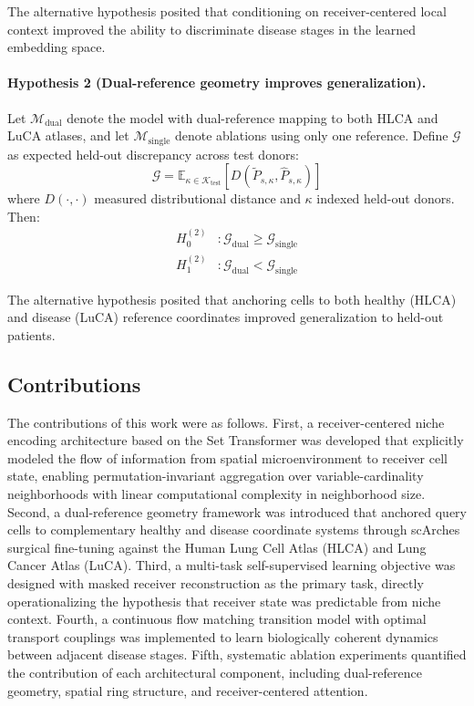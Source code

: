 The alternative hypothesis posited that conditioning on receiver-centered local context improved the ability to discriminate disease stages in the learned embedding space.

\paragraph{Hypothesis 2 (Dual-reference geometry improves generalization).} Let $\mathcal{M}_{\text{dual}}$ denote the model with dual-reference mapping to both HLCA and LuCA atlases, and let $\mathcal{M}_{\text{single}}$ denote ablations using only one reference. Define $\mathcal{G}$ as expected held-out discrepancy across test donors:
\begin{equation}
\mathcal{G} = \mathbb{E}_{\kappa \in \mathcal{K}_{\text{test}}} \left[ D(\tilde{P}_{s,\kappa}, \hat{P}_{s,\kappa}) \right]
\end{equation}
where $D(\cdot, \cdot)$ measured distributional distance and $\kappa$ indexed held-out donors. Then:
\begin{align}
H_0^{(2)}&: \mathcal{G}_{\text{dual}} \geq \mathcal{G}_{\text{single}} \\
H_1^{(2)}&: \mathcal{G}_{\text{dual}} < \mathcal{G}_{\text{single}}
\end{align}

The alternative hypothesis posited that anchoring cells to both healthy (HLCA) and disease (LuCA) reference coordinates improved generalization to held-out patients.


\subsection{Contributions}

The contributions of this work were as follows. First, a receiver-centered niche encoding architecture based on the Set Transformer was developed that explicitly modeled the flow of information from spatial microenvironment to receiver cell state, enabling permutation-invariant aggregation over variable-cardinality neighborhoods with linear computational complexity in neighborhood size. Second, a dual-reference geometry framework was introduced that anchored query cells to complementary healthy and disease coordinate systems through scArches surgical fine-tuning against the Human Lung Cell Atlas (HLCA) and Lung Cancer Atlas (LuCA). Third, a multi-task self-supervised learning objective was designed with masked receiver reconstruction as the primary task, directly operationalizing the hypothesis that receiver state was predictable from niche context. Fourth, a continuous flow matching transition model with optimal transport couplings was implemented to learn biologically coherent dynamics between adjacent disease stages. Fifth, systematic ablation experiments quantified the contribution of each architectural component, including dual-reference geometry, spatial ring structure, and receiver-centered attention.


